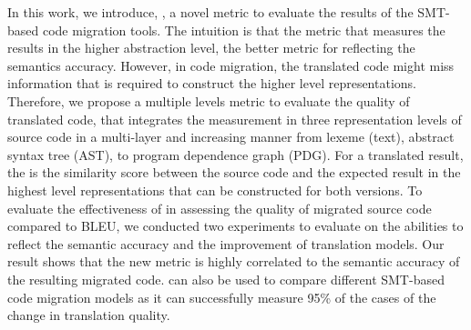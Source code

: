 

In this work, we introduce, {\model}, a novel metric to evaluate the
results of the SMT-based code migration tools. The intuition is that
the metric that measures the results in the higher abstraction level,
the better metric for reflecting the semantics accuracy. However, in
code migration, the translated code might miss information that is
required to construct the higher level representations. Therefore, we
propose a multiple levels metric to evaluate the quality of translated
code, that integrates the measurement in three representation levels
of source code in a multi-layer and increasing manner from lexeme
(text), abstract syntax tree (AST), to program dependence
graph (PDG). For a translated result, the {\model} is the similarity
score between the source code and the expected result in the highest
level representations that can be constructed for both versions. To
evaluate the effectiveness of {\model} in assessing the quality of
migrated source code compared to BLEU, we conducted two experiments to
evaluate {\model} on the abilities to reflect the semantic accuracy
and the improvement of translation models. Our result shows that the
new metric {\model} is highly correlated to the semantic accuracy of
the resulting migrated code. {\model} can also be used to compare
different SMT-based code migration models as it can successfully
measure 95\% of the cases of the change in translation quality.

